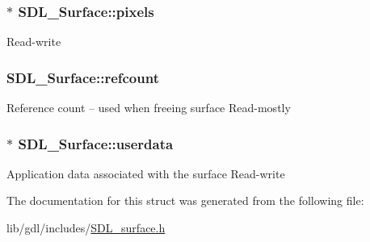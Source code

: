 \subsubsection[{pixels}]{$\ast$ S\+D\+L\+\_\+\+Surface\+::pixels}\label{struct_s_d_l___surface_abd9597e0e084b8ef33fe0397bc26d911}
Read-\/write \hypertarget{struct_s_d_l___surface_a03d10628a359c0674f5ceffd574f1641}{}
\subsubsection[{refcount}]{ S\+D\+L\+\_\+\+Surface\+::refcount}\label{struct_s_d_l___surface_a03d10628a359c0674f5ceffd574f1641}
Reference count -- used when freeing surface Read-\/mostly \hypertarget{struct_s_d_l___surface_ae66d973dcb9b57cb34815892e1ee1f31}{}
\subsubsection[{userdata}]{$\ast$ S\+D\+L\+\_\+\+Surface\+::userdata}\label{struct_s_d_l___surface_ae66d973dcb9b57cb34815892e1ee1f31}
Application data associated with the surface Read-\/write 

The documentation for this struct was generated from the following file\+:\begin{DoxyCompactItemize}
\item 
lib/gdl/includes/\hyperlink{_s_d_l__surface_8h}{S\+D\+L\+\_\+surface.\+h}\end{DoxyCompactItemize}
